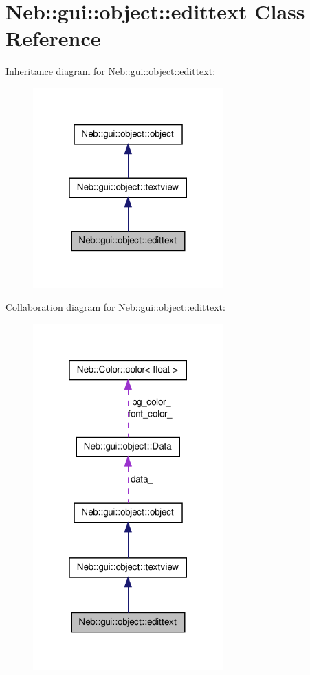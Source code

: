 \hypertarget{classNeb_1_1gui_1_1object_1_1edittext}{\section{\-Neb\-:\-:gui\-:\-:object\-:\-:edittext \-Class \-Reference}
\label{classNeb_1_1gui_1_1object_1_1edittext}
}


\-Inheritance diagram for \-Neb\-:\-:gui\-:\-:object\-:\-:edittext\-:\nopagebreak
\begin{figure}[H]
\begin{center}
\leavevmode
\includegraphics[width=208pt]{classNeb_1_1gui_1_1object_1_1edittext__inherit__graph}
\end{center}
\end{figure}


\-Collaboration diagram for \-Neb\-:\-:gui\-:\-:object\-:\-:edittext\-:\nopagebreak
\begin{figure}[H]
\begin{center}
\leavevmode
\includegraphics[width=208pt]{classNeb_1_1gui_1_1object_1_1edittext__coll__graph}
\end{center}
\end{figure}
